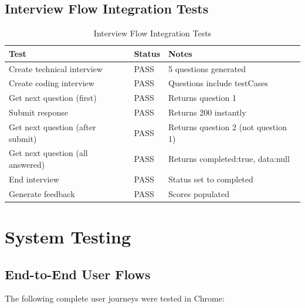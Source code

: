 \subsection{Interview Flow Integration Tests}

\begin{table}[H]
\centering
\caption{Interview Flow Integration Tests}
\vspace{8pt}
\begin{tabularx}{\textwidth}{|X|C{1.8cm}|X|}
\hline
\textbf{Test} & \textbf{Status} & \textbf{Notes} \\
\hline
Create technical interview & PASS & 5 questions generated \\
\hline
Create coding interview & PASS & Questions include testCases \\
\hline
Get next question (first) & PASS & Returns question 1 \\
\hline
Submit response & PASS & Returns 200 instantly \\
\hline
Get next question (after submit) & PASS & Returns question 2 (not question 1) \\
\hline
Get next question (all answered) & PASS & Returns completed:true, data:null \\
\hline
End interview & PASS & Status set to completed \\
\hline
Generate feedback & PASS & Scores populated \\
\hline
\end{tabularx}
\label{tab:interviewtest}
\end{table}

\section{System Testing}

\subsection{End-to-End User Flows}

The following complete user journeys were tested in Chrome:

